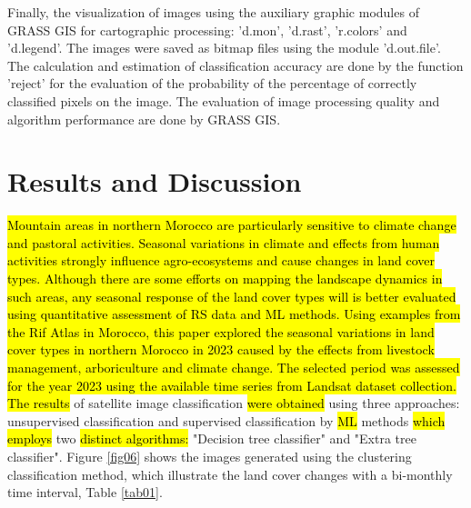 \documentclass[geomatics,article,submit,pdftex,moreauthors]{Definitions/mdpi}
\begin{document}
Finally, the visualization of images using the auxiliary graphic modules of GRASS GIS for cartographic processing: 'd.mon', 'd.rast', 'r.colors' and 'd.legend'. The images were saved as bitmap files using the module 'd.out.file'. The calculation and estimation of classification accuracy are done by the function 'reject' for the evaluation of the probability of the percentage of correctly classified pixels on the image. The evaluation of image processing quality and algorithm performance are done by GRASS GIS.

\section{Results and Discussion}

\hl{Mountain areas in northern Morocco are particularly sensitive to climate change and pastoral activities. Seasonal variations in climate and effects from human activities strongly influence agro-ecosystems and cause changes in land cover types. Although there are some efforts on mapping the landscape dynamics in such areas, any seasonal response of the land cover types will is better evaluated using quantitative assessment of RS data and ML methods. Using examples from the Rif Atlas in Morocco, this paper explored the seasonal variations in land cover types in northern Morocco in 2023 caused by the effects from livestock management, arboriculture and climate change. The selected period was assessed for the year 2023 using the available time series from Landsat dataset collection. The results} of satellite image classification \hl{were obtained} using three approaches: unsupervised classification and supervised classification by \hl{ML} methods \hl{which employs} two \hl{distinct algorithms:} "Decision tree classifier" and "Extra tree classifier". Figure \ref{fig06} shows the images generated using the clustering classification method, which illustrate the land cover changes with a bi-monthly time interval, Table \ref{tab01}.
\end{document}
